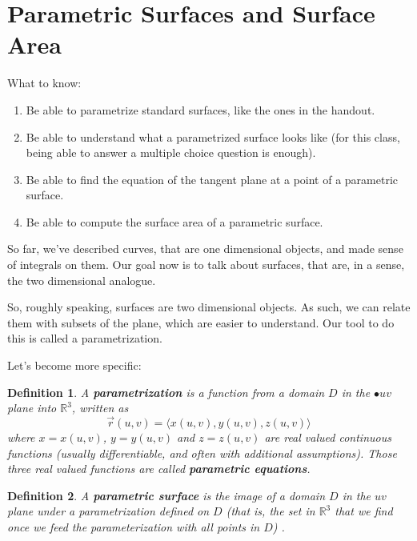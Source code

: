 \documentclass[12pt]{article}
\title{}
\newcommand{\R}{ \mathbb{R}}
\newcommand{\vr}{\vec{r}{}}
\renewcommand{\lg}{\langle}
\newcommand{\rg}{\rangle}
\newtheorem{defn}{Definition}
\begin{document}
\section*{Parametric Surfaces and Surface Area}
What to know:
\begin{enumerate}
\item Be able to parametrize standard surfaces, like the ones in the handout.
\item Be able to understand what a parametrized surface looks like (for this class, being able to answer a multiple choice question is enough).
\item Be able to find the equation of the tangent plane at a point of a parametric surface.
\item Be able to compute the surface area of a parametric surface.
\end{enumerate}

So far, we've described curves, that are one dimensional objects, and made sense of integrals on them. Our goal now is to talk about surfaces, that are, in a sense, the two dimensional analogue.

So, roughly speaking, surfaces are two dimensional objects. As such, we can relate them with subsets of the plane, which are easier to understand. Our tool to do this is called a parametrization.

Let's become more specific: 
\begin{defn} 
A \textbf{parametrization} is a function from a domain $D$ in the $•uv$ plane into $\R^3$, written as 
$$\vr(u,v)=\lg x(u,v),y(u,v),z(u,v)\rg$$
where $x=x(u,v)$, $y=y(u,v)$ and $z=z(u,v)$ are real valued continuous functions (usually differentiable, and often with additional assumptions). Those three real valued functions are called \textbf{parametric equations}.
\end{defn}
\begin{defn}
A\textbf{ parametric surface} is the image of a domain $D$ in the $uv$ plane under a parametrization defined on $D$ (that is, the set in $\R^3$ that we find once we feed the parameterization with all points in $D$) .
\end{defn}
\end{document}
